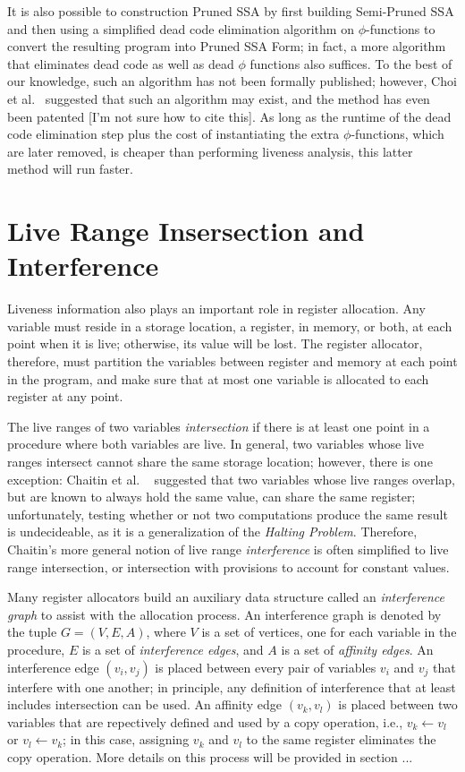 It is also possible to construction Pruned SSA by first
building Semi-Pruned SSA and then using a simplified dead code
elimination algorithm on $\phi$-functions to convert the
resulting program into Pruned SSA Form; in fact, a more
algorithm that eliminates dead code as well as dead $\phi$
functions also suffices. To the best of our knowledge, such
an algorithm has not been formally published; however, Choi
et al.~\cite{ChoiJan91} suggested that such an algorithm
may exist, and the method has even been patented
[I'm not sure how to cite this]. As long as the runtime of
the dead code elimination step plus the cost of instantiating
the extra $\phi$-functions, which are later removed, is 
cheaper than performing liveness analysis, this latter
method will run faster. 

\section{Live Range Insersection and Interference}

Liveness information also plays an important role in
register allocation. Any variable must reside in a 
storage location, a register, in memory, or both, at each
point when it is live; otherwise, its value will be lost.
The register allocator, therefore, must partition the
variables between register and memory at each point in
the program, and make sure that at most one variable is
allocated to each register at any point. 

The live ranges of two variables \emph{intersection} if
there is at least one point in a procedure where both
variables are live. In general, two variables whose live
ranges intersect cannot share the same storage location;
however, there is one exception: Chaitin et al.
~\cite{Chaitin81,ChaitinJun82} suggested that two variables
whose live ranges overlap, but are known to always hold
the same value, can share the same register; unfortunately,
testing whether or not two computations produce the same
result is undecideable, as it is a generalization of
the \emph{Halting Problem}. Therefore, Chaitin's more
general notion of live range \emph{interference} is often 
simplified to live range intersection, or intersection
with provisions to account for constant values. 

Many register allocators build an auxiliary data structure
called an \emph{interference graph} to assist with the
allocation process. An interference graph is denoted by
the tuple $G = (V, E, A)$, where $V$ is a set of vertices,
one for each variable in the procedure, $E$ is a set of
\emph{interference edges}, and $A$ is a set of 
\emph{affinity edges}. An interference edge $(v_{i}, v_{j})$
is placed between every pair of variables $v_{i}$ and 
$v_{j}$ that interfere with one another; in principle,
any definition of interference that at least includes
intersection can be used. An affinity edge $(v_{k}, v_{l})$
is placed between two variables that are repectively 
defined and used by a copy operation, i.e., 
$v_{k} \leftarrow v_{l}$ or $v_{l} \leftarrow v_{k}$;
in this case, assigning $v_{k}$ and $v_{l}$ to the
same register eliminates the copy operation. More details
on this process will be provided in section ...

